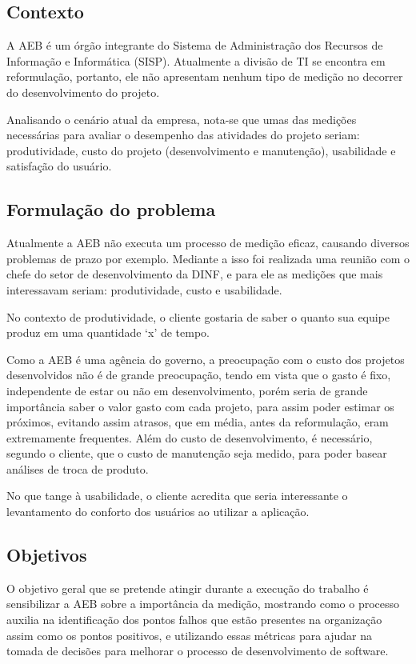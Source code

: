 \subsection{Contexto}
	A AEB é um órgão integrante do Sistema de Administração dos Recursos de Informação e Informática (SISP). Atualmente a divisão de TI se encontra em reformulação, portanto, ele não apresentam nenhum tipo de medição no decorrer do desenvolvimento do projeto.

	Analisando o cenário atual da empresa, nota-se que umas das medições necessárias para avaliar o desempenho das atividades do projeto seriam: produtividade, custo do projeto (desenvolvimento e manutenção), usabilidade e satisfação do usuário.

\subsection{Formulação do problema}
	Atualmente a AEB não executa um processo de medição eficaz, causando diversos problemas de prazo por exemplo. Mediante a isso foi realizada uma reunião com o chefe do setor de desenvolvimento da DINF, e para ele as medições que mais interessavam seriam: produtividade, custo e usabilidade.

	No contexto de produtividade, o cliente gostaria de saber o quanto sua equipe produz em uma quantidade ‘x’ de tempo.

	Como a AEB é uma agência do governo, a preocupação com o custo dos projetos desenvolvidos não é de grande preocupação, tendo em vista que o gasto é fixo, independente de estar ou não em desenvolvimento, porém seria de grande importância  saber o valor gasto com cada projeto, para assim poder estimar os próximos, evitando assim atrasos, que em média, antes da reformulação, eram extremamente frequentes. Além do custo de desenvolvimento, é necessário, segundo o cliente, que o custo de manutenção seja medido, para poder basear análises de troca de produto.

	No que tange à usabilidade, o cliente acredita que seria interessante o levantamento do conforto dos usuários ao utilizar a aplicação.

\subsection{Objetivos}

	O objetivo geral que se pretende atingir durante a execução do trabalho é sensibilizar a AEB sobre a importância da medição, mostrando como o processo auxilia na identificação dos pontos falhos que estão presentes na organização assim como os pontos positivos, e utilizando essas métricas para ajudar na tomada de decisões para melhorar o processo de desenvolvimento de software.

